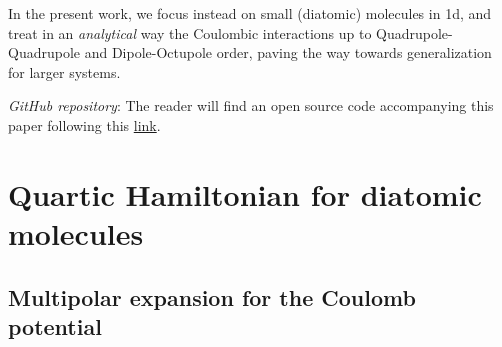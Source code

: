 \documentclass[reprint, amsmath, amssymb, aps, prl]{revtex4-2}
\begin{document}
    In the present work, we focus instead on small (diatomic) molecules in 1d, and treat in an \textit{analytical} way the Coulombic interactions up to Quadrupole-Quadrupole and Dipole-Octupole order, paving the way towards generalization for larger systems.

    \textit{GitHub repository}: The reader will find an open source code accompanying this paper following this \href{https://github.com/MatthieuSarkis/Quartic-Potential}{link}.

\section{Quartic Hamiltonian for diatomic molecules}

    \subsection{Multipolar expansion for the Coulomb potential}
\end{document}
